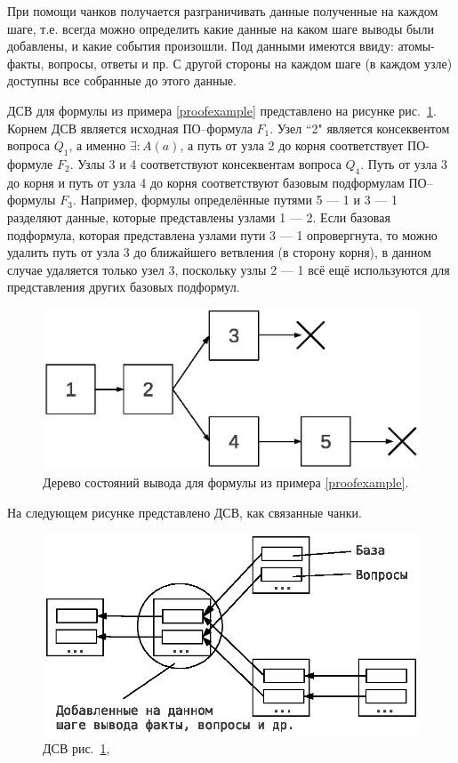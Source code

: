 При помощи чанков получается разграничивать данные полученные на каждом шаге, т.е. всегда можно определить какие данные на каком шаге выводы были добавлены, и какие события произошли. Под данными имеются ввиду: атомы-факты, вопросы, ответы и пр.  С другой стороны на каждом шаге (в каждом узле) доступны все собранные до этого данные.

ДСВ для формулы из примера \ref{proofexample} представлено на рисунке рис.~\ref{fig:pst}. Корнем ДСВ является исходная ПО--формула $F_1$. Узел ``2" является консеквентом вопроса $Q_1$, а именно $\exists\colon A(a)$, а путь от узла 2 до корня соответствует ПО-формуле $F_2$. Узлы 3 и 4 соответствуют консеквентам вопроса $Q_4$. Путь от узла 3 до корня и путь от узла 4 до корня соответствуют базовым подформулам ПО--формулы $F_3$. Например, формулы определённые путями 5 --- 1 и 3 --- 1 разделяют данные, которые представлены узлами 1 --- 2. Если базовая подформула, которая представлена узлами пути 3 --- 1 опровергнута, то можно удалить путь от узла 3 до ближайшего ветвления (в сторону корня), в данном случае удаляется только узел 3, поскольку узлы 2 --- 1 всё ещё используются для представления других базовых подформул.

\begin{figure}[h]
	\centering
	\includegraphics[width=0.4\linewidth]{pics/PST.eps}
	\caption{Дерево состояний вывода для формулы из примера \ref{proofexample}.}
	\label{fig:pst}
\end{figure}

На следующем рисунке представлено ДСВ, как связанные чанки.

\begin{figure}[h]
	\centering
	\includegraphics[width=0.6\linewidth]{pics/PST2.eps}
	\caption{ДСВ рис.~\ref{fig:pst}, }
	\label{fig:pst2}
\end{figure}

